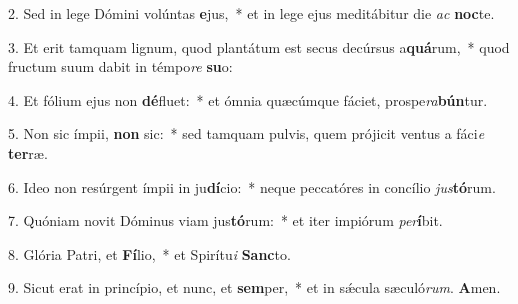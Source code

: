 2. Sed in lege Dómini volúntas \textbf{e}jus,~*  et in lege ejus meditábitur die \textit{ac} \textbf{noc}te.\

3. Et erit tamquam lignum, quod plantátum est secus decúrsus a\textbf{quá}rum,~*  quod fructum suum dabit in témpo\textit{re} \textbf{su}o:\

4. Et fólium ejus non \textbf{dé}fluet:~*  et ómnia quæcúmque fáciet, prospe\textit{ra}\textbf{bún}tur.\

5. Non sic ímpii, \textbf{non} sic:~*  sed tamquam pulvis, quem prójicit ventus a fáci\textit{e} \textbf{ter}ræ.\

6. Ideo non resúrgent ímpii in ju\textbf{dí}cio:~*  neque peccatóres in concílio \textit{jus}\textbf{tó}rum.\

7. Quóniam novit Dóminus viam jus\textbf{tó}rum:~*  et iter impiórum \textit{per}\textbf{í}bit.\

8. Glória Patri, et \textbf{Fí}lio,~*  et Spirítu\textit{i} \textbf{Sanc}to.\

9. Sicut erat in princípio, et nunc, et \textbf{sem}per,~*  et in sǽcula sæculó\textit{rum}. \textbf{A}men.\

